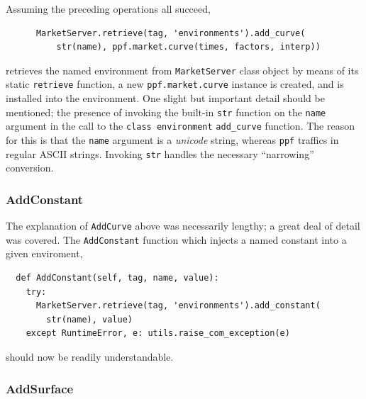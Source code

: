 Assuming the preceding operations all succeed, 
\begin{verbatim}
      MarketServer.retrieve(tag, 'environments').add_curve(
          str(name), ppf.market.curve(times, factors, interp))
\end{verbatim}
retrieves the named environment from \verb|MarketServer| class object
by means of its static \verb|retrieve| function, a new
\verb|ppf.market.curve| instance is created, and is installed into the
environment. One slight but important detail should be mentioned; the
presence of invoking the built-in \verb|str| function on the
\verb|name| argument in the call to the \verb|class environment|
\verb|add_curve| function. The reason for this is that the \verb|name|
argument is a \emph{unicode} string, whereas \verb|ppf| traffics in
regular ASCII strings. Invoking \verb|str| handles the necessary
``narrowing'' conversion.

\subsubsection{AddConstant}

The explanation of \verb|AddCurve| above was necessarily lengthy; a
great deal of detail was covered. The \verb|AddConstant| function
which injects a named constant into a given enviroment,
\begin{verbatim}
  def AddConstant(self, tag, name, value):
    try:
      MarketServer.retrieve(tag, 'environments').add_constant(
        str(name), value)
    except RuntimeError, e: utils.raise_com_exception(e)
\end{verbatim}
should now be readily understandable.

\subsubsection{AddSurface}

